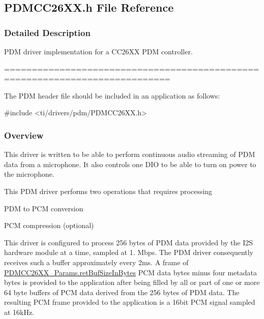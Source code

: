 \subsection{P\+D\+M\+C\+C26\+X\+X.\+h File Reference}
\label{_p_d_m_c_c26_x_x_8h}


\subsubsection{Detailed Description}
P\+D\+M driver implementation for a C\+C26\+X\+X P\+D\+M controller. 

============================================================================

The P\+D\+M header file should be included in an application as follows\+: 
\begin{DoxyCode}
\textcolor{preprocessor}{#include <ti/drivers/pdm/PDMCC26XX.h>}
\end{DoxyCode}


\subsubsection*{Overview}

This driver is written to be able to perform continuous audio streaming of P\+D\+M data from a microphone. It also controls one D\+I\+O to be able to turn on power to the microphone.

This P\+D\+M driver performs two operations that requires processing
\begin{DoxyItemize}
\item P\+D\+M to P\+C\+M conversion
\item P\+C\+M compression (optional)
\end{DoxyItemize}

This driver is configured to process 256 bytes of P\+D\+M data provided by the I2\+S hardware module at a time, sampled at 1. Mbps. The P\+D\+M driver consequently receives such a buffer approximately every 2ms. A frame of \hyperlink{struct_p_d_m_c_c26_x_x___params_a05bff0a3c2ddbb3a49c2bc7a47a7fe24}{P\+D\+M\+C\+C26\+X\+X\+\_\+\+Params.\+ret\+Buf\+Size\+In\+Bytes} P\+C\+M data bytes minus four metadata bytes is provided to the application after being filled by all or part of one or more 64 byte buffers of P\+C\+M data derived from the 256 bytes of P\+D\+M data. The resulting P\+C\+M frame provided to the application is a 16bit P\+C\+M signal sampled at 16k\+Hz.

